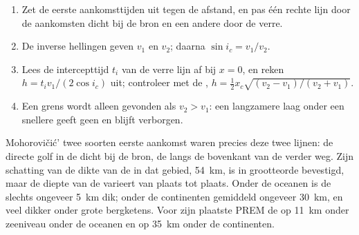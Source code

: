 \begin{method}\label{met:b1:layered-earth:moho}
\begin{enumerate}
  \item Zet de eerste aankomsttijden uit tegen de afstand, en pas één rechte lijn door de aankomsten dicht bij de bron en een andere door de verre.
  \item De inverse hellingen geven $v_1$ en $v_2$; daarna $\sin i_c = v_1/v_2$.
  \item Lees de intercepttijd $t_i$ van de verre lijn af bij $x = 0$, en reken $h = t_i v_1/(2\cos i_c)$ uit; controleer met de ,
        $h = \tfrac12 x_c\sqrt{(v_2 - v_1)/(v_2 + v_1)}$.
  \item Een grens wordt alleen gevonden als $v_2 > v_1$: een langzamere laag onder een snellere geeft geen  en blijft verborgen.
\end{enumerate}
\end{method}

Mohorovičić' twee soorten eerste aankomst waren precies deze twee lijnen: de directe golf in de  dicht bij de bron, de  langs de
bovenkant van de  verder weg. Zijn schatting van de dikte van de  in dat gebied, \qty{54}{km}, is in grootteorde bevestigd, maar de
diepte van de  varieert van plaats tot plaats. Onder de oceanen is de  slechts ongeveer \qty{5}{km} dik; onder de continenten
gemiddeld ongeveer \qty{30}{km}, en veel dikker onder grote bergketens. Voor zijn  plaatste PREM de  op \qty{11}{km} onder
zeeniveau onder de oceanen en op \qty{35}{km} onder de continenten.

